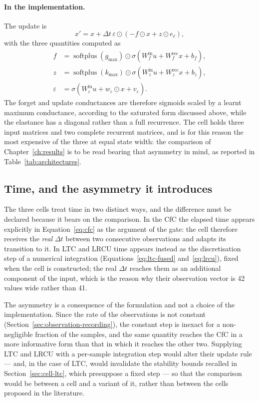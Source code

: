 \paragraph{In the implementation.}
The update is
\begin{equation}
  x' = x + \Delta t\, \varepsilon \odot
       \left(-f \odot x + z \odot e_{\ell}\right),
  \label{eq:lrcu}
\end{equation}
with the three quantities computed as
\begin{align}
  f           &= \operatorname{softplus}(g_{\max}) \odot \sigma\!\left(W^{\text{in}}_f u + W^{\text{rec}}_f x + b_f\right), \\
  z           &= \operatorname{softplus}(k_{\max}) \odot \sigma\!\left(W^{\text{in}}_z u + W^{\text{rec}}_z x + b_z\right), \\
  \varepsilon &= \sigma\!\left(W^{\text{in}}_\varepsilon u + w_\varepsilon \odot x + v_\varepsilon\right).
\end{align}
The forget and update conductances are therefore sigmoids scaled by a learnt
maximum conductance, according to the saturated form discussed above, while the
elastance has a diagonal rather than a full recurrence. The cell holds three
input matrices and two complete recurrent matrices, and is for this reason the
most expensive of the three at equal state width: the comparison of
Chapter~\ref{ch:results} is to be read bearing that asymmetry in mind, as
reported in Table~\ref{tab:architectures}.

\subsection{Time, and the asymmetry it introduces}
\label{sec:cell-time}

The three cells treat time in two distinct ways, and the difference must be
declared because it bears on the comparison. In the CfC the elapsed time appears
explicitly in Equation~\eqref{eq:cfc} as the argument of the gate: the cell
therefore receives the \emph{real} $\Delta t$ between two consecutive
observations and adapts its transition to it. In LTC and LRCU time appears
instead as the discretisation step of a numerical integration
(Equations~\eqref{eq:ltc-fused} and~\eqref{eq:lrcu}), fixed when the cell is
constructed; the real $\Delta t$ reaches them as an additional component of the
input, which is the reason why their observation vector is \num{42} values wide
rather than \num{41}.

The asymmetry is a consequence of the formulation and not a choice of the
implementation. Since the rate of the observations is not constant
(Section~\ref{sec:observation-recording}), the constant step is inexact for a
non-negligible fraction of the samples, and the same quantity reaches the CfC in
a more informative form than that in which it reaches the other two. Supplying
LTC and LRCU with a per-sample integration step would alter their update rule
--- and, in the case of LTC, would invalidate the stability bounds recalled in
Section~\ref{sec:cell-ltc}, which presuppose a fixed step --- so that the
comparison would be between a cell and a variant of it, rather than between the
cells proposed in the literature.

